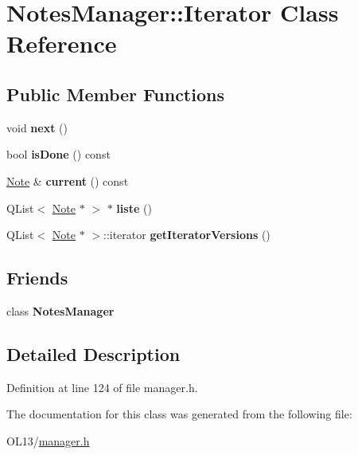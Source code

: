 \hypertarget{class_notes_manager_1_1_iterator}{}\section{Notes\+Manager\+:\+:Iterator Class Reference}
\label{class_notes_manager_1_1_iterator}
\subsection*{Public Member Functions}
\begin{DoxyCompactItemize}
\item 
\mbox{\label{class_notes_manager_1_1_iterator_a1a79699fe56e691c3f1c72eb46703fc6}} 
void {\bfseries next} ()
\item 
\mbox{\label{class_notes_manager_1_1_iterator_ab9afd283687410c5591f97881ac17b29}} 
bool {\bfseries is\+Done} () const
\item 
\mbox{\label{class_notes_manager_1_1_iterator_aaf695d1b7faf4afa9a36115f5e9d3547}} 
\hyperlink{class_note}{Note} \& {\bfseries current} () const
\item 
\mbox{\label{class_notes_manager_1_1_iterator_ab64667e5cf5e2285761c6eaa12797a83}} 
Q\+List$<$ \hyperlink{class_note}{Note} $\ast$ $>$ $\ast$ {\bfseries liste} ()
\item 
\mbox{\label{class_notes_manager_1_1_iterator_ab0cfae90dcf5788e37f4bf84f5c58093}} 
Q\+List$<$ \hyperlink{class_note}{Note} $\ast$ $>$\+::iterator {\bfseries get\+Iterator\+Versions} ()
\end{DoxyCompactItemize}
\subsection*{Friends}
\begin{DoxyCompactItemize}
\item 
\mbox{\label{class_notes_manager_1_1_iterator_a017a5144e8cfa6087305055ab968ef41}} 
class {\bfseries Notes\+Manager}
\end{DoxyCompactItemize}


\subsection{Detailed Description}


Definition at line 124 of file manager.\+h.



The documentation for this class was generated from the following file\+:\begin{DoxyCompactItemize}
\item 
O\+L13/\hyperlink{manager_8h}{manager.\+h}\end{DoxyCompactItemize}
